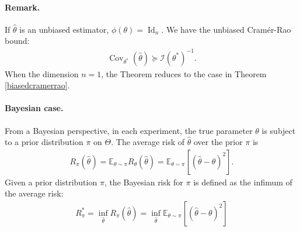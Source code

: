 \documentclass{article}
\numberwithin{equation}{section}
\newcommand{\E}{\mathbb{E}}
\renewcommand{\cal}{\mathcal}
\newcommand{\wh}{\widehat}
\DeclareMathOperator{\id}{Id}
\DeclareMathOperator{\cov}{Cov}
\theoremstyle{plain}
\theoremstyle{definition}
\begin{document}
\paragraph{Remark.} If $\wh\theta$ is an unbiased estimator, $\phi(\theta)=\id_n$. We have the unbiased Cramér-Rao bound:
\begin{align*}
	\cov_{\theta^*}(\wh{\theta})\succeq\cal{I}(\theta^*)^{-1}.
\end{align*}
When the dimension $n=1$, the Theorem reduces to the case in Theorem \ref{biasedcramerrao}.

\paragraph{Bayesian case.} From a Bayesian perspective, in each experiment, the true parameter $\theta$ is subject to a prior distribution $\pi$ on $\Theta$.  The average risk of $\wh{\theta}$ over the prior $\pi$ is
\begin{align*}
	R_\pi(\wh{\theta})=\E_{\theta\sim\pi}R_\theta(\wh{\theta})=\E_{\theta\sim\pi}\left[(\wh\theta-\theta)^2\right].
\end{align*}
Given a prior distribution $\pi$, the Bayesian risk for $\pi$ is defined as the infimum of the average risk: 
\begin{align*}
	R_\pi^*=\inf_{\wh{\theta}}R_\pi(\wh\theta)=\inf_{\wh{\theta}}\E_{\theta\sim\pi}\left[(\wh\theta-\theta)^2\right]
\end{align*}
\end{document}
